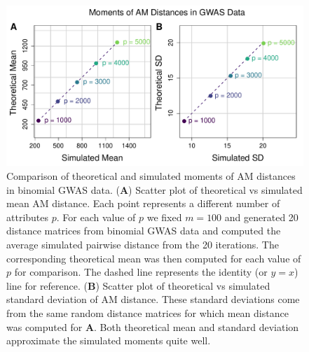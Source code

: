 \documentclass[10pt,letterpaper]{article}\usepackage[]{graphicx}\usepackage[]{color}
\begin{document}
\begin{figure}[H]
	\includegraphics[width=\textwidth]{compared_moments_gwas_am.pdf}
	\caption{Comparison of theoretical and simulated moments of AM distances in binomial GWAS data. (\textbf{A}) Scatter plot of theoretical vs simulated mean AM distance. Each point represents a different number of attributes $p$. For each value of $p$ we fixed $m=100$ and generated 20 distance matrices from binomial GWAS data and computed the average simulated pairwise distance from the 20 iterations. The corresponding theoretical mean was then computed for each value of $p$ for comparison. The dashed line represents the identity (or $y=x$) line for reference. (\textbf{B}) Scatter plot of theoretical vs simulated standard deviation of AM distance. These standard deviations come from the same random distance matrices for which mean distance was computed for \textbf{A}. Both theoretical mean and standard deviation approximate the simulated moments quite well.}
\end{figure}
\end{document}
